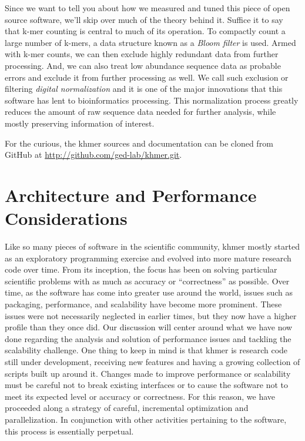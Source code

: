 \documentclass{article}
\begin{document}

Since we want to tell you about how we measured and tuned this piece of open
source software, we'll skip over much of the theory behind it. Suffice it to
say that k-mer counting is central to much of its operation. To compactly count
a large number of k-mers, a data structure known as a \textit{Bloom filter}
\citep{web:BloomFilter} is used. Armed with k-mer counts, we can then exclude
highly redundant data from further processing. And, we can also treat low
abundance sequence data as probable errors and exclude it from further
processing as well. We call such exclusion or filtering \textit{digital
normalization} and it is one of the major innovations that this software has
lent to bioinformatics processing. This normalization process greatly reduces
the amount of raw sequence data needed for further analysis, while mostly
preserving information of interest.

For the curious, the khmer sources and documentation can be cloned from GitHub
at \url{http://github.com/ged-lab/khmer.git}.

\section{Architecture and Performance Considerations}

Like so many pieces of software in the scientific community, khmer mostly
started as an exploratory programming exercise and evolved into more mature
research code over time. From its inception, the focus has been on solving
particular scientific problems with as much as accuracy or ``correctness'' as
possible. Over time, as the software has come into greater use around the
world, issues such as packaging, performance, and scalability have become more
prominent. These issues were not necessarily neglected in earlier times, but
they now have a higher profile than they once did. Our discussion will center
around what we have now done regarding the analysis and solution of performance
issues and tackling the scalability challenge. One thing to keep in mind is
that khmer is research code still under development, receiving new features and
having a growing collection of scripts built up around it.  Changes made to
improve performance or scalability must be careful not to break existing
interfaces or to cause the software not to meet its expected level or accuracy
or correctness. For this reason, we have proceeded along a strategy of careful,
incremental optimization and parallelization. In conjunction with other
activities pertaining to the software, this process is essentially perpetual.
\end{document}
